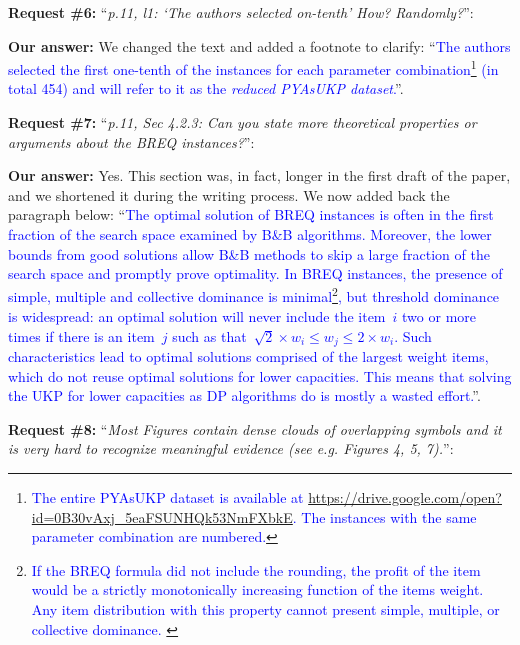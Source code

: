 \documentclass{elsarticle}
\begin{document}
\textbf{Request \#6:} ``\textit{p.11, l1: `The authors selected on-tenth' How? Randomly?}'':

\textbf{Our answer: } We changed the text and added a footnote to clarify: ``\textcolor{blue}{The authors selected the first one-tenth of the instances for each parameter combination\footnote{\textcolor{blue}{The entire PYAsUKP dataset is available at \url{https://drive.google.com/open?id=0B30vAxj_5eaFSUNHQk53NmFXbkE}. The instances with the same parameter combination are numbered.}} (in total 454) and will refer to it as the \emph{reduced PYAsUKP dataset}.}''.
\medskip

\textbf{Request \#7:} ``\textit{p.11, Sec 4.2.3: Can you state more theoretical properties or arguments about the BREQ instances?}'':

\textbf{Our answer:}
Yes.
This section was, in fact, longer in the first draft of the paper, and we shortened it during the writing process.
We now added back the paragraph below:
``\textcolor{blue}{The optimal solution of BREQ instances is often in the first fraction of the search space examined by B\&B algorithms. Moreover, the lower bounds from good solutions allow B\&B methods to skip a large fraction of the search space and promptly prove optimality. In BREQ instances, the presence of simple, multiple and collective dominance is minimal\footnote{\textcolor{blue}{
If the BREQ formula did not include the rounding, the profit of the item would be a strictly monotonically increasing function of the items weight.
Any item distribution with this property cannot present simple, multiple, or collective dominance.
}}, but threshold dominance is widespread: an optimal solution will never include the item~\(i\) two or more times if there is an item~\(j\) such as that~\(\sqrt{2} \times w_i \leq w_j \leq 2 \times w_i\).
Such characteristics lead to optimal solutions comprised of the largest weight items, which do not reuse optimal solutions for lower capacities.
This means that solving the UKP for lower capacities as DP algorithms do is mostly a wasted effort.}''.
\medskip

\textbf{Request \#8:} ``\textit{Most Figures contain dense clouds of overlapping symbols and it is very hard to recognize meaningful evidence (see e.g. Figures 4, 5, 7).}'':
\end{document}
